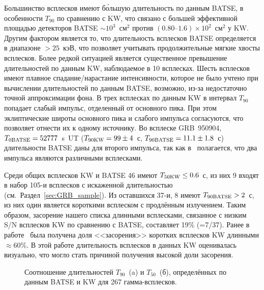 Большинство всплесков имеют б\'{о}льшую длительность по данным BATSE, 
в особенности $T_{90}$ по сравнению с KW, что связано с большей  эффективной площадью детекторов 
BATSE $\sim 10^3$~см$^2$ против $(0.80\textrm{--}1.6)\times 10^2$~см$^2$ у KW. 
Другим фактором является то, что длительность всплесков BATSE определяется в 
диапазоне $>25$~кэВ, что позволяет учитывать продолжительные мягкие хвосты всплесков. 
Более редкой ситуацией является существенное превышение длительностей по данным KW, 
наблюдаемое в 10 всплесках. Шесть всплесков имеют плавное спадание/нарастание интенсивности, 
которое не было учтено при вычислении  длительностей по данным BATSE, возможно, 
из-за недостаточно точной аппроксимации фона. В трех всплесках по данным KW
в интервал $T_{90}$ попадает слабый импульс, отделенный от основного пика. 
При этом эклиптические широты основного пика и слабого импульса согласуются, 
что позволяет отнести их к одному источнику. Во всплеске GRB~950904, 
$T_{0{\mathrm{BATSE}}} = 52777$~s~UT ($T_{90{\mathrm{KW}}} = 99 \pm 4$~с, $T_{90{\mathrm{BATSE}}} = 11.1\pm 1.8$~с) 
длительности BATSE даны для второго импульса, так как в~\citep{Hurley_2005} полагается, 
что два импульса являются различными всплесками.

Среди общих всплесков KW и BATSE 46 имеют $T_{50{\mathrm{KW}}} \leq 0.6$~с, 
из них 9 входят в набор 105-и всплесков с искаженной длительностью (см.~Раздел~\ref{sec:GRB_sample}). 
Из оставшихся 37-и, 8 имеют $T_{90{\mathrm{BATSE}}} > 2$~с, 
из них один является короткими всплеском с продлённым излучением. Таким образом, 
засорение нашего списка длинными всплесками, связанное с низким S/N всплесков KW
по сравнению с BATSE, составляет 19\% (=7/37). %
Ранее в работе~\citep{Ofek_2007ApJ} была получена доля 
<<засорения>> коротких всплесков KW длинными $\approx 60$\%. В этой работе
длительность всплесков в данных KW оценивалась визуально, что могло 
стать причиной получения высокой доли засорения. 

\begin{figure}[h]
  \begin{minipage}[h]{0.5\textwidth}
  \end{minipage}
  \hfill
  \begin{minipage}[h]{0.5\textwidth}
  \end{minipage}
  \caption{Соотношение длительностей $T_{90}$~(a) и $T_{50}$~(б), определённых по 
  данным BATSE и KW для 267 гамма-всплесков.}
  \label{img:T90andT50_KWvsBATSE}  
\end{figure}

